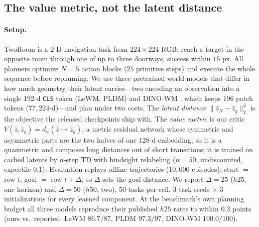 
\subsection{The value metric, not the latent distance}
\label{sec:tworoom}

\paragraph{Setup.}
TwoRoom is a $2$-D navigation task from $224\times224$ RGB: reach a target in
the opposite room through one of up to three doorways, success within $16$ px.
All planners optimize $N = 5$ action blocks ($25$ primitive steps) and execute
the whole sequence before replanning. We use three pretrained world models
that differ in how much geometry their latent carries---two encoding an
observation into a single $192$-d \texttt{CLS} token (LeWM, PLDM) and DINO-WM
\citep{zhou2024dinowm}, which keeps $196$ patch tokens ($77{,}224$-d)---and
plan under two costs. The \emph{latent distance}
$\lVert \hat z_N - \hat z_g\rVert_2^2$ is the objective the released
checkpoints ship with. The \emph{value metric} is our critic
$V(\hat z,\hat z_g) = d_\psi(\hat z \!\to\! \hat z_g)$, a metric residual
network \citep{liu2022metric} whose symmetric and asymmetric parts are the two
halves of one $128$-d embedding, so it is a quasimetric and composes long
distances out of short transitions; it is trained on cached latents by $n$-step
TD with hindsight relabeling \citep{andrychowicz2017her} ($n = 50$,
undiscounted, expectile $0.1$). Evaluation replays offline trajectories
($10{,}000$ episodes): start $=$ row $t$, goal $=$ row $t+\Delta$, so $\Delta$
sets the goal distance. We report $\Delta = 25$ ($h25$, one horizon) and
$\Delta = 50$ ($h50$, two), $50$ tasks per cell, $3$ task seeds $\times$ $3$
initializations for every learned component. At the benchmark's own planning
budget all three models reproduce their published $h25$ rates to within
$0.3$ points (ours vs.\ reported: LeWM $86.7/87$, PLDM $97.3/97$, DINO-WM
$100.0/100$).

